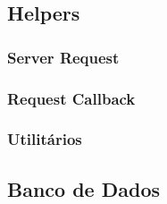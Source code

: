 \subsection{Helpers}

\subsubsection{Server Request}
%
\subsubsection{Request Callback}

\subsubsection{Utilitários}


\subsection{Banco de Dados}
\lstset{inputpath = ./codes}
